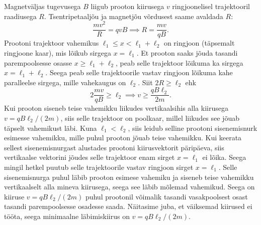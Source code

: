 \documentclass[10pt]{article}
\begin{document}
\solu
Magnetväljas tugevusega $B$ liigub prooton kiirusega $v$ ringjoonelisel trajektooril raadiusega $R$. Tsentripetaaljõu ja magnetjõu võrdusest saame avaldada $R$:
\[\frac{mv^2}{R}=qvB\implies R=\frac{mv}{qB}.\]
Prootoni trajektoor vahemikus $\ell_1\leq x < \ell_1+\ell_2$ on ringjoon (täpsemalt ringjoone kaar), mis lõikub sirgega $x=\ell_1$. Et prooton saaks jõuda tasandi parempoolsesse osasse $x\geq \ell_1+\ell_2$, peab selle trajektoor lõikuma ka sirgega $x=\ell_1+\ell_2$. Seega peab selle trajektoorile vastav ringjoon lõikuma kahe paralleelse sirgega, mille vahekaugus on $\ell_2$. Siit $2R \geq \ell_2$ ehk
\[2\frac{mv}{qB}\geq \ell_2\implies v\geq \frac{qB\ell_2}{2m}.\]
Kui prooton siseneb teise vahemikku liikudes vertikaalsihis alla kiirusega $v= qB\ell_2/(2m)$, siis selle trajektoor on poolkaar, millel liikudes see jõuab täpselt vahemikust läbi. Kuna $\ell_1<\ell_2$, siis leidub selline prootoni sisenemisnurk esimesse vahemikku, mille puhul prooton jõuab teise vahemikku. Kui keerata sellest sisenemisnurgast alustades prootoni kiirusvektorit päripäeva, siis vertikaalse vektorini jõudes selle trajektoor enam sirget $x=\ell_1$ ei lõika. Seega mingil hetkel puutub selle trajektoorile vastav ringjoon sirget $x=\ell_1$. Selle sisenemisnurga puhul läbib prooton esimese vahemiku ja siseneb teise vahemikku vertikaalselt alla mineva kiirusega, seega see läbib mõlemad vahemikud. Seega on kiiruse $v= qB\ell_2/(2m)$ puhul prootonil võimalik tasandi vasakpoolsest osast tasandi parempoolsesse osadesse saada. Näitasime juba, et väiksemad kiirused ei tööta, seega minimaalne läbimiskiirus on $v= qB\ell_2/(2m)$.
\end{document}
